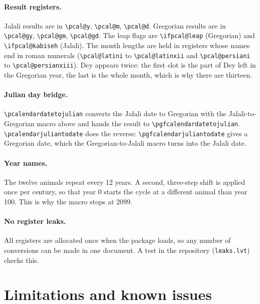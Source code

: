 \documentclass[11pt]{article}
\newcommand\cs[1]{\texttt{\textbackslash #1}}
\begin{document}
\paragraph{Result registers.} Jalali results are in \cs{pcal@y}, \cs{pcal@m}, \cs{pcal@d}. Gregorian
results are in \cs{pcal@gy}, \cs{pcal@gm}, \cs{pcal@gd}. The leap flags are \cs{ifpcal@leap}
(Gregorian) and \cs{ifpcal@kabiseh} (Jalali). The month lengths are held in registers whose names end in
roman numerals (\cs{pcal@latini} to \cs{pcal@latinxii} and \cs{pcal@persiani} to
\cs{pcal@persianxiii}). Dey appears twice: the first slot is the part of Dey left in the Gregorian year, the last is
the whole month, which is why there are thirteen.

\paragraph{Julian day bridge.} \cs{pcalendardatetojulian} converts the Jalali date to Gregorian with the
Jalali-to-Gregorian macro above and hands the result to \cs{pgfcalendardatetojulian}.
\cs{pcalendarjuliantodate} does the reverse: \cs{pgfcalendarjuliantodate} gives a Gregorian date, which the
Gregorian-to-Jalali macro turns into the Jalali date.

\paragraph{Year names.} The twelve animals repeat every 12 years. A second, three-step shift is applied
once per century, so that year 0 starts the cycle at a different animal than year 100. This is why the
macro stops at 2099.

\paragraph{No register leaks.} All registers are allocated once when the package loads, so any number of
conversions can be made in one document. A test in the repository (\texttt{leaks.lvt}) checks this.

\section{Limitations and known issues}\label{sec:limitations9}
\end{document}
